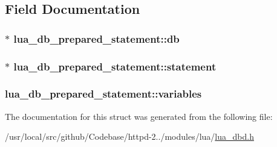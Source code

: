 \subsection{Field Documentation}
\subsubsection[{\texorpdfstring{db}{db}}]{$\ast$ lua\+\_\+db\+\_\+prepared\+\_\+statement\+::db}\hypertarget{structlua__db__prepared__statement_aa0e4fb9c42fa26d8c00eec7a2450ec32}{}\label{structlua__db__prepared__statement_aa0e4fb9c42fa26d8c00eec7a2450ec32}
\subsubsection[{\texorpdfstring{statement}{statement}}]{$\ast$ lua\+\_\+db\+\_\+prepared\+\_\+statement\+::statement}\hypertarget{structlua__db__prepared__statement_ad29b98c7951db2947945a6cd2c0733e1}{}\label{structlua__db__prepared__statement_ad29b98c7951db2947945a6cd2c0733e1}
\subsubsection[{\texorpdfstring{variables}{variables}}]{ lua\+\_\+db\+\_\+prepared\+\_\+statement\+::variables}\hypertarget{structlua__db__prepared__statement_a696bd485fc4b6ab3e9b6474a332db6c8}{}\label{structlua__db__prepared__statement_a696bd485fc4b6ab3e9b6474a332db6c8}


The documentation for this struct was generated from the following file\+:\begin{DoxyCompactItemize}
\item 
/usr/local/src/github/\+Codebase/httpd-\/2../modules/lua/\hyperlink{lua__dbd_8h}{lua\+\_\+dbd.\+h}\end{DoxyCompactItemize}
